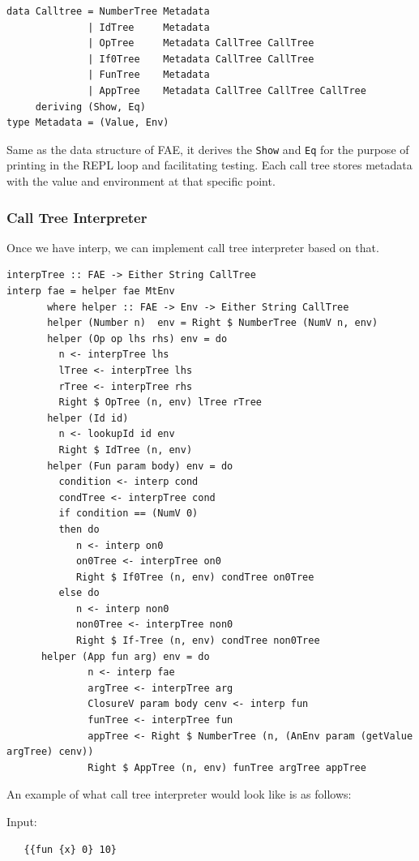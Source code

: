 \documentclass[format=acmlarge, review=false, nonacm=false, screen=true]{acmart}
\begin{document}
\begin{verbatim}
data Calltree = NumberTree Metadata
              | IdTree     Metadata
              | OpTree     Metadata CallTree CallTree
              | If0Tree    Metadata CallTree CallTree
              | FunTree    Metadata
              | AppTree    Metadata CallTree CallTree CallTree
     deriving (Show, Eq)
type Metadata = (Value, Env)
\end{verbatim}

Same as the data structure of FAE, it derives the \texttt{Show} and \texttt{Eq} for the purpose of printing in the REPL loop and facilitating testing. Each call tree stores metadata with the value and environment at that specific point.

\subsubsection{Call Tree Interpreter}
Once we have interp, we can implement call tree interpreter based on that.
\begin{verbatim}
interpTree :: FAE -> Either String CallTree
interp fae = helper fae MtEnv
       where helper :: FAE -> Env -> Either String CallTree
       helper (Number n)  env = Right $ NumberTree (NumV n, env)
       helper (Op op lhs rhs) env = do
         n <- interpTree lhs
         lTree <- interpTree lhs
         rTree <- interpTree rhs
         Right $ OpTree (n, env) lTree rTree
       helper (Id id)
         n <- lookupId id env
         Right $ IdTree (n, env)
       helper (Fun param body) env = do
         condition <- interp cond
         condTree <- interpTree cond
         if condition == (NumV 0)
         then do
            n <- interp on0
            on0Tree <- interpTree on0
            Right $ If0Tree (n, env) condTree on0Tree
         else do
            n <- interp non0
            non0Tree <- interpTree non0
            Right $ If-Tree (n, env) condTree non0Tree
      helper (App fun arg) env = do
              n <- interp fae 
              argTree <- interpTree arg 
              ClosureV param body cenv <- interp fun 
              funTree <- interpTree fun 
              appTree <- Right $ NumberTree (n, (AnEnv param (getValue argTree) cenv))
              Right $ AppTree (n, env) funTree argTree appTree
\end{verbatim}

An example of what call tree interpreter would look like is as follows:

Input:
\begin{verbatim}
   {{fun {x} 0} 10}
\end{verbatim}
\end{document}
